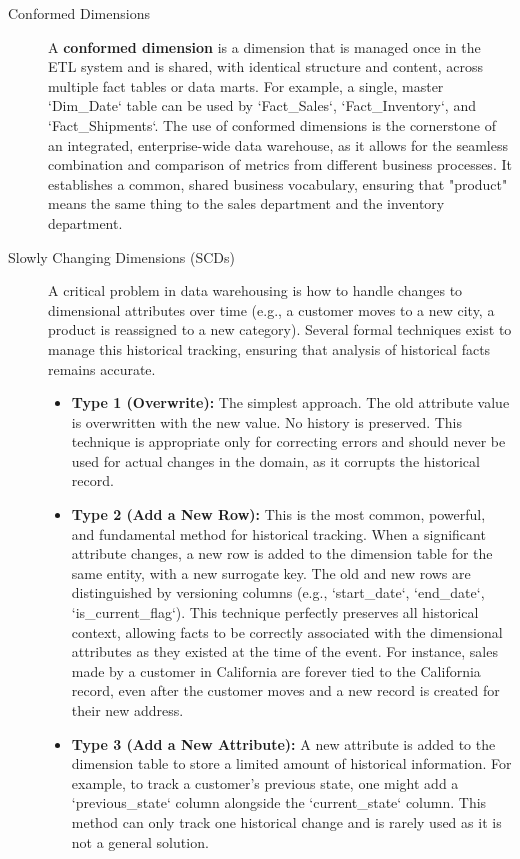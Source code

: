 \begin{description}
    \item[Conformed Dimensions] A \textbf{conformed dimension} is a dimension that is managed once in the ETL system and is shared, with identical structure and content, across multiple fact tables or data marts. For example, a single, master `Dim\_Date` table can be used by `Fact\_Sales`, `Fact\_Inventory`, and `Fact\_Shipments`. The use of conformed dimensions is the cornerstone of an integrated, enterprise-wide data warehouse, as it allows for the seamless combination and comparison of metrics from different business processes. It establishes a common, shared business vocabulary, ensuring that "product" means the same thing to the sales department and the inventory department.

    \item[Slowly Changing Dimensions (SCDs)] A critical problem in data warehousing is how to handle changes to dimensional attributes over time (e.g., a customer moves to a new city, a product is reassigned to a new category). Several formal techniques exist to manage this historical tracking, ensuring that analysis of historical facts remains accurate.
    \begin{itemize}
        \item \textbf{Type 1 (Overwrite):} The simplest approach. The old attribute value is overwritten with the new value. No history is preserved. This technique is appropriate only for correcting errors and should never be used for actual changes in the domain, as it corrupts the historical record.
        \item \textbf{Type 2 (Add a New Row):} This is the most common, powerful, and fundamental method for historical tracking. When a significant attribute changes, a new row is added to the dimension table for the same entity, with a new surrogate key. The old and new rows are distinguished by versioning columns (e.g., `start\_date`, `end\_date`, `is\_current\_flag`). This technique perfectly preserves all historical context, allowing facts to be correctly associated with the dimensional attributes as they existed at the time of the event. For instance, sales made by a customer in California are forever tied to the California record, even after the customer moves and a new record is created for their new address.
        \item \textbf{Type 3 (Add a New Attribute):} A new attribute is added to the dimension table to store a limited amount of historical information. For example, to track a customer's previous state, one might add a `previous\_state` column alongside the `current\_state` column. This method can only track one historical change and is rarely used as it is not a general solution.
    \end{itemize}
\end{description}

